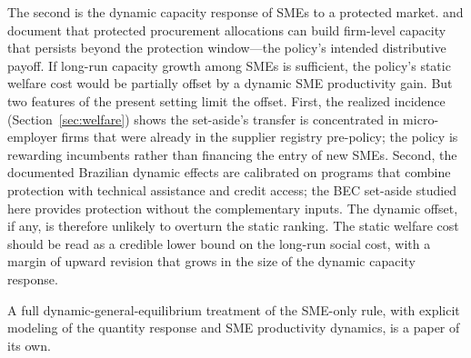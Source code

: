 The second is the dynamic capacity response of SMEs to a protected market. \citet{szerman2023} and \citet{cabral2017} document that protected procurement allocations can build firm-level capacity that persists beyond the protection window---the policy's intended distributive payoff. If long-run capacity growth among SMEs is sufficient, the policy's static welfare cost would be partially offset by a dynamic SME productivity gain. But two features of the present setting limit the offset. First, the realized incidence (Section~\ref{sec:welfare}) shows the set-aside's transfer is concentrated in micro-employer firms that were already in the supplier registry pre-policy; the policy is rewarding incumbents rather than financing the entry of new SMEs. Second, the documented Brazilian dynamic effects \citep{cabral2017} are calibrated on programs that combine protection with technical assistance and credit access; the BEC set-aside studied here provides protection without the complementary inputs. The dynamic offset, if any, is therefore unlikely to overturn the static ranking. The static welfare cost should be read as a credible lower bound on the long-run social cost, with a margin of upward revision that grows in the size of the dynamic capacity response.

A full dynamic-general-equilibrium treatment of the SME-only rule, with explicit modeling of the quantity response and SME productivity dynamics, is a paper of its own.
